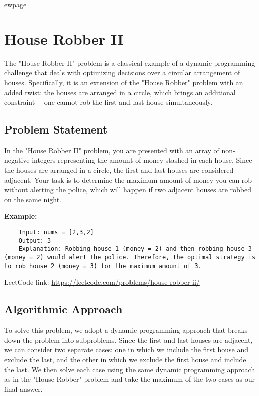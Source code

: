 
ewpage
\chapter{House Robber II}
\label{chap:House_Robber_II}

The "House Robber II" problem is a classical example of a dynamic programming challenge that deals with optimizing decisions over a circular arrangement of houses. Specifically, it is an extension of the "House Robber" problem with an added twist: the houses are arranged in a circle, which brings an additional constraint— one cannot rob the first and last house simultaneously.

\section*{Problem Statement}
In the "House Robber II" problem, you are presented with an array of non-negative integers representing the amount of money stashed in each house. Since the houses are arranged in a circle, the first and last houses are considered adjacent. Your task is to determine the maximum amount of money you can rob without alerting the police, which will happen if two adjacent houses are robbed on the same night.

\textbf{Example:}

\begin{verbatim}
    Input: nums = [2,3,2]
    Output: 3
    Explanation: Robbing house 1 (money = 2) and then robbing house 3 (money = 2) would alert the police. Therefore, the optimal strategy is to rob house 2 (money = 3) for the maximum amount of 3.
\end{verbatim}

LeetCode link: \href{https://leetcode.com/problems/house-robber-ii/}{https://leetcode.com/problems/house-robber-ii/}

\section*{Algorithmic Approach}
To solve this problem, we adopt a dynamic programming approach that breaks down the problem into subproblems. Since the first and last houses are adjacent, we can consider two separate cases: one in which we include the first house and exclude the last, and the other in which we exclude the first house and include the last. We then solve each case using the same dynamic programming approach as in the "House Robber" problem and take the maximum of the two cases as our final answer.

